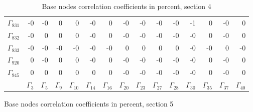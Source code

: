 {%
\ifhevea\begin{table}\fi%
\begin{center}
\ifhevea
\caption{Base nodes correlation coefficients in percent, section 4\label{tab:br-fit-corr4}}%
\else
\begin{minipage}{\linewidth}
\begin{center}
\label{tab:br-fit-corr4}%
\fi
\begin{envsmall}
\begin{center}
\renewcommand*{\arraystretch}{1.1}%
\begin{tabular}{rrrrrrrrrrrrrrr}
\hline
\( \Gamma_{831} \) &   -0 &   -0 &    0 &    0 &   -0 &    0 &   -0 &   -0 &   -0 &   -0 &   -1 &    0 &   -0 &    0 \\
\( \Gamma_{832} \) &   -0 &    0 &    0 &    0 &   -0 &    0 &   -0 &   -0 &   -0 &   -0 &   -0 &    0 &   -0 &    0 \\
\( \Gamma_{833} \) &   -0 &   -0 &   -0 &   -0 &   -0 &   -0 &    0 &    0 &    0 &    0 &   -0 &   -0 &    0 &   -0 \\
\( \Gamma_{920} \) &    0 &   -0 &    0 &    0 &   -0 &    0 &   -0 &   -0 &   -0 &   -0 &   -0 &    0 &   -0 &    0 \\
\( \Gamma_{945} \) &    0 &    0 &    0 &    0 &    0 &    0 &   -0 &   -0 &   -0 &   -0 &   -0 &    0 &   -0 &    0 \\
 & \( \Gamma_{3} \) & \( \Gamma_{5} \) & \( \Gamma_{9} \) & \( \Gamma_{10} \) & \( \Gamma_{14} \) & \( \Gamma_{16} \) & \( \Gamma_{20} \) & \( \Gamma_{23} \) & \( \Gamma_{27} \) & \( \Gamma_{28} \) & \( \Gamma_{30} \) & \( \Gamma_{35} \) & \( \Gamma_{37} \) & \( \Gamma_{40} \)
\\\hline
\end{tabular}
\end{center}
\end{envsmall}
\ifhevea\else
\end{center}
\end{minipage}
\fi
\end{center}
\ifhevea\end{table}\fi
\ifhevea\begin{table}\fi%
\begin{center}
\ifhevea
\caption{Base nodes correlation coefficients in percent, section 5\label{tab:br-fit-corr5}}%
\else

\end{center}
\end{table}}

